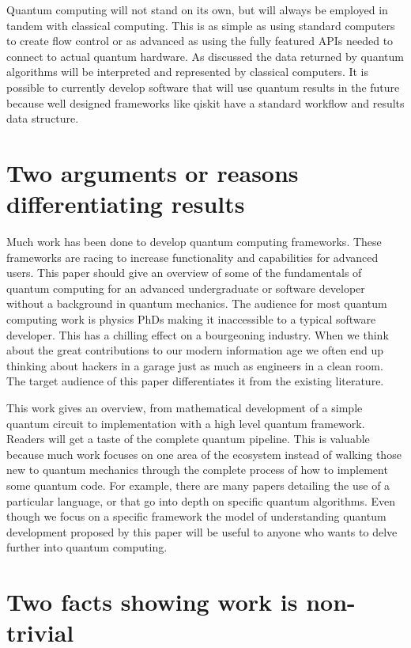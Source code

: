 \documentclass{article}
\begin{document}
Quantum computing will not stand on its own, but will always be employed in tandem with classical computing. This is as simple as using standard computers to create flow control or as advanced as using the fully featured APIs needed to connect to actual quantum hardware. As discussed the data returned by quantum algorithms will be interpreted and represented by classical computers. It is possible to currently develop software that will use quantum results in the future because well designed frameworks like qiskit have a standard workflow and results data structure.


\section{Two arguments or reasons differentiating results}
Much work has been done to develop quantum computing frameworks. These frameworks are racing to increase functionality and capabilities for advanced users. This paper should give an overview of some of the fundamentals of quantum computing for an advanced undergraduate or software developer without a background in quantum mechanics. The audience for most quantum computing work is physics PhDs making it inaccessible to a typical software developer. This has a chilling effect on a bourgeoning industry. When we think about the great contributions to our modern information age we often end up thinking about hackers in a garage just as much as engineers in a clean room. The target audience of this paper differentiates it from the existing literature. 

This work gives an overview, from mathematical development of a simple quantum circuit to implementation with a high level quantum framework. Readers will get a taste of the complete quantum pipeline. This is valuable because much work focuses on one area of the ecosystem instead of walking those new to quantum mechanics through the complete process of how to implement some quantum code. For example, there are many papers detailing the use of a particular language, or that go into depth on specific quantum algorithms. Even though we focus on a specific framework the model of understanding quantum development proposed by this paper will be useful to anyone who wants to delve further into quantum computing. 



\section{Two facts showing work is non-trivial}
\end{document}

